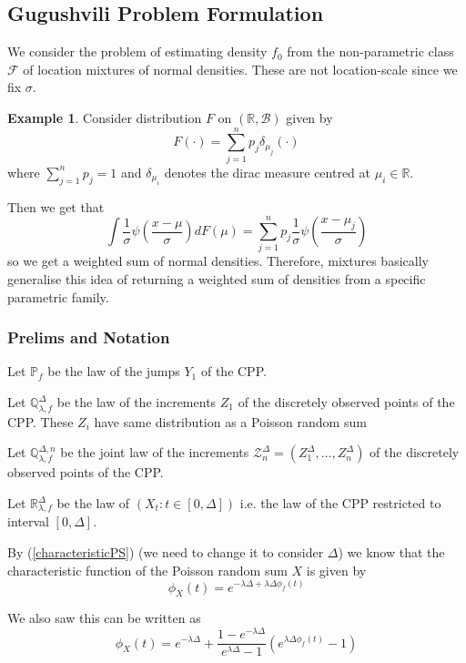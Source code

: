 \documentclass[a4paper,11pt]{article}
\theoremstyle{theorem}
\theoremstyle{definition}
\newtheorem*{eg}{Example}
\begin{document}
\subsection{Gugushvili Problem Formulation}

We consider the problem of estimating density $f_{0}$ from the non-parametric class $\mathcal{F}$ of location mixtures of normal densities. These are not location-scale since we fix $\sigma$.

\begin{eg}
Consider distribution $F$ on $(\mathbb{R}, \mathcal{B})$ given by
\[
F(\cdot) = \sum_{j=1}^{n}{p_j\delta_{\mu_j}(\cdot)}
\]  
where $\sum_{j=1}^{n}{p_j} = 1$ and $\delta_{\mu_i}$ denotes the dirac measure centred at $\mu_i \in \mathbb{R}$.

Then we get that
\[
\int{\frac{1}{\sigma}\psi\left(\frac{x- \mu}{\sigma}\right)dF(\mu)} = \sum_{j=1}^{n}{p_j\frac{1}{\sigma}\psi\left(\frac{x- \mu_j}{\sigma}\right)}
\]
so we get a weighted sum of normal densities. Therefore, mixtures basically generalise this idea of returning a weighted sum of densities from a specific parametric family.
\end{eg}

\subsubsection{Prelims and Notation}

Let $\mathbb{P}_{f}$ be the law of the jumps $Y_1$ of the CPP.

Let $\mathbb{Q}_{\lambda, f}^{\Delta}$ be the law of the increments $Z_1$ of the discretely observed points of the CPP. These $Z_i$ have same distribution as a Poisson random sum

Let $\mathbb{Q}_{\lambda, f}^{\Delta, n}$ be the joint law of the increments $\mathcal{Z}_{n}^{\Delta} = (Z_{1}^{\Delta}, \dotsc, Z_{n}^{\Delta})$ of the discretely observed points of the CPP.

Let $\mathbb{R}_{\lambda, f}^{\Delta}$ be the law of $(X_t : t \in [0, \Delta])$ i.e. the law of the CPP restricted to interval $[0, \Delta]$.

By (\ref{characteristicPS}) (we need to change it to consider $\Delta$) we know that the characteristic function of the Poisson random sum $X$ is given by
\[
\phi_{X}(t) = e^{-\lambda \Delta + \lambda \Delta \phi_{f}(t)}
\]

We also saw this can be written as 
\[
\phi_{X}(t) = e^{-\lambda \Delta} + \frac{1 - e^{-\lambda \Delta}}{e^{\lambda \Delta} - 1}(e^{\lambda \Delta \phi_{f}(t)} - 1)
\]
\end{document}
